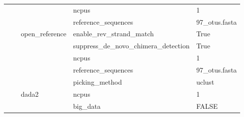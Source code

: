 \begin{table}[]
{\begin{tabular}{|l|l|l|l|l|}
                                          &                                                           &                                        & ncpus                                  & 1                                                              \\ \cline{4-5}
                                          &                                                           &                                        & reference\_sequences                   & 97\_otus.fasta                                                 \\ \cline{3-5}
                                          &                                                           & \multirow{5}{*}{open\_reference}       & enable\_rev\_strand\_match             & True                                                           \\ \cline{4-5}
                                          &                                                           &                                        & suppress\_de\_novo\_chimera\_detection & True                                                           \\ \cline{4-5}
                                          &                                                           &                                        & ncpus                                  & 1                                                              \\ \cline{4-5}
                                          &                                                           &                                        & reference\_sequences                   & 97\_otus.fasta                                                 \\ \cline{4-5}
                                          &                                                           &                                        & picking\_method                        & uclust                                                         \\ \cline{3-5}
                                          &                                                           & \multirow{2}{*}{dada2}                 & ncpus                                  & 1                                                              \\ \cline{4-5}
                                          &                                                           &                                        & big\_data                              & FALSE                                                          \\ \cline{3-5}

\end{tabular}}
\end{table}
